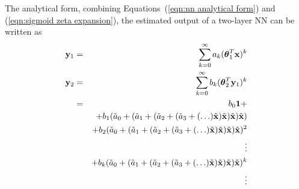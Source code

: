 The analytical form, combining Equations~(\ref{eqn:nn analytical form}) and (\ref{eqn:sigmoid zeta expansion}), the estimated output of a two-layer NN can be written as
\begin{eqnarray}
	{\bold y}_1 & = & \sum_{k=0}^\infty a_k (\boldsymbol\theta_1^T {\bold x})^k \nonumber \\
	{\bold y}_2 & = & \sum_{k=0}^\infty b_k (\boldsymbol\theta_2^T {\bold y}_1)^k \nonumber \\
		& = & b_0 {\bold 1} + \nonumber\\
		&   & + b_1 (\tilde a_0 +%
					(\tilde a_1 + %
						(\tilde a_2 + %
							(\tilde a_3 + %
								(\ldots) \tilde {\bold x} )%
							\tilde {\bold x} )%
						\tilde {\bold x} )%
					\tilde {\bold x}) \nonumber \\
		&   & + b_2 (\tilde a_0 +%
					(\tilde a_1 + %
						(\tilde a_2 + %
							(\tilde a_3 + %
								(\ldots) \tilde {\bold x} )%
							\tilde {\bold x} )%
						\tilde {\bold x} )%
					\tilde {\bold x})^2 \nonumber \\
		&   & \vdots \nonumber \\
		&   & + b_k (\tilde a_0 +%
					(\tilde a_1 + %
						(\tilde a_2 + %
							(\tilde a_3 + %
								(\ldots) \tilde {\bold x} )%
							\tilde {\bold x} )%
						\tilde {\bold x} )%
					\tilde {\bold x})^k \nonumber \\
		&   & \vdots
\end{eqnarray}
